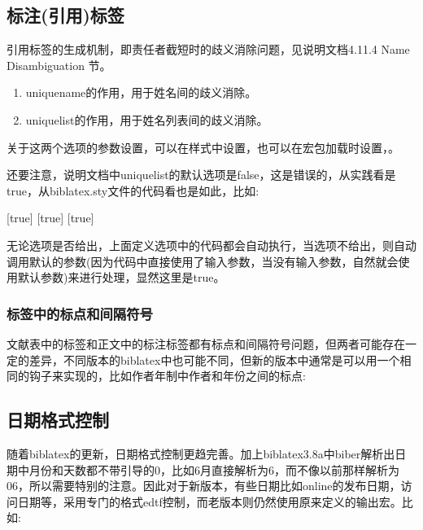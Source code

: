 \subsection{标注(引用)标签}
引用标签的生成机制，即责任者截短时的歧义消除问题，见说明文档4.11.4 Name Disambiguation 节。
  \begin{enumerate}
    \item uniquename的作用，用于姓名间的歧义消除。
    \item uniquelist的作用，用于姓名列表间的歧义消除。
  \end{enumerate}


关于这两个选项的参数设置，可以在样式中设置，也可以在宏包加载时设置，。

还要注意，说明文档中uniquelist的默认选项是false，这是错误的，从实践看是true，从biblatex.sty文件的代码看也是如此，比如:
\begin{texlist}
[true]{%
    {}
    {}}
[true]{%
    {}
    {}}
[true]{%
    {}
    {}}
\def\blx@opt@uniquelist@false{0}
\def\blx@opt@uniquelist@true{1}
\def\blx@opt@uniquelist@minyear{2}
\end{texlist}
无论选项是否给出，上面定义选项中的代码都会自动执行，当选项不给出，则自动调用默认的参数(因为代码中直接使用了输入参数，当没有输入参数，自然就会使用默认参数)来进行处理，显然这里是true。

\subsubsection{标签中的标点和间隔符号}\label{sec:label:fmt}
文献表中的标签和正文中的标注标签都有标点和间隔符号问题，但两者可能存在一定的差异，不同版本的biblatex中也可能不同，但新的版本中通常是可以用一个相同的钩子来实现的，比如作者年制中作者和年份之间的标点:
\begin{texlist}
\renewcommand*{\nameyeardelim}{\addcomma\space}
\end{texlist}

\subsection{日期格式控制}\label{sec:date:fmt}
随着biblatex的更新，日期格式控制更趋完善。加上biblatex3.8a中biber解析出日期中月份和天数都不带引导的0，比如6月直接解析为6，而不像以前那样解析为06，所以需要特别的注意。因此对于新版本，有些日期比如online的发布日期，访问日期等，采用专门的格式edtf控制，而老版本则仍然使用原来定义的输出宏。比如:

